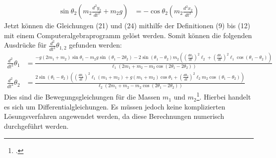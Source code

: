 \documentclass[titlepage, 11pt, a4paper, ngerman]{article}
\begin{document}
\begin{align}
    \sin{\theta_{2}} (m_{2} \frac{d^{2}y_{2}}{dt^{2}} + m_{2}g) &= - \cos{\theta_{2}} (m_{2} \frac{d^{2}x_{2}}{dt^{2}})
\end{align}
\bigbreak
Jetzt können die Gleichungen (21) und (24) mithilfe der Definitionen (9) bis (12) mit einem Computeralgebraprogramm gelöst werden. Somit können die folgenden Ausdrücke für $\frac{d^{2}}{dt^{2}}\theta_{1, 2}$ gefunden werden:
\begin{align}
    \frac{d^{2}}{dt^{2}}\theta_{1} &= \frac{- g (2 m_{1} + m_{2}) \sin{\theta_{1}} - m_{2}g \sin{(\theta_{1} - 2 \theta_{2})} - 2 \sin{(\theta_{1} - \theta_{2})} m_{2} ((\frac{d\theta_{2}}{dt})^{2} \ell_{2} + (\frac{d \theta_{1}}{dt})^{2} \ell_{1} \cos{(\theta_{1} - \theta_{2})})}{\ell_{1} (2m_{1} + m_{2} - m_{2} \cos{(2 \theta_{1} - 2 \theta_{2})})} \\
    \frac{d^{2}}{dt^{2}}\theta_{2} &= \frac{2 \sin{(\theta_{1} - \theta_{2})} ((\frac{d \theta_{1}}{dt})^{2} \ell_{1} (m_{1} + m_{2}) + g (m_{1} + m_{2}) \cos{\theta_{1}} + (\frac{d \theta_{2}}{dt})^{2} \ell_{2}m_{2} \cos{(\theta_{1} - \theta_{2})})}{\ell_{2} (2m_{1} + m_{2} - m_{2} \cos{(2 \theta_{1} - 2 \theta_{2})})}
\end{align}
\bigbreak
Dies sind die Bewegungsgleichungen für die Massen $m_{1}$ und $m_{2}$\footcite{dp-kinematics-website}. Hierbei handelt es sich um Differentialgleichungen. Es müssen jedoch keine komplizierten Lösungsverfahren angewendet werden, da diese Berechnungen numerisch durchgeführt werden.
\end{document}

